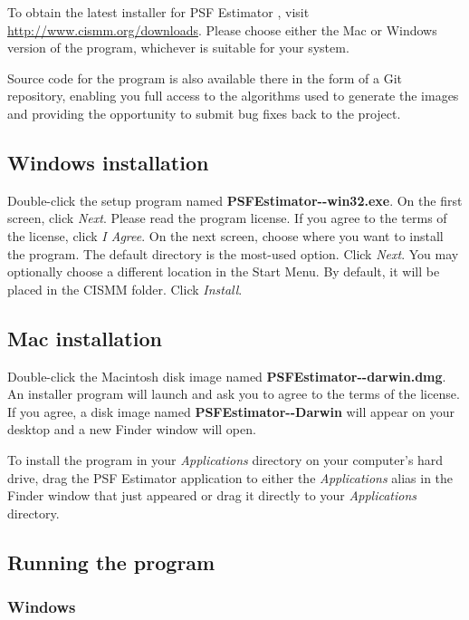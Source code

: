 \documentclass[11pt,titlepage,twoside]{article}
\begin{document}
To obtain the latest installer for PSF Estimator \ProgramVersionNoSpace, visit \url{http://www.cismm.org/downloads}. Please choose either the Mac or Windows version of the program, whichever is suitable for your system.

Source code for the program is also available there in the form of a Git repository, enabling you full access to the algorithms used to generate the images and providing the opportunity to submit bug fixes back to the project. 

\subsection{Windows installation}

Double-click the setup program named \textbf{PSFEstimator-\ProgramVersionNoSpace-win32.exe}. On the first screen, click \emph{Next}. Please read the program license. If you agree to the terms of the license, click \emph{I Agree}. On the next screen, choose where you want to install the program. The default directory is the most-used option. Click \emph{Next}. You may optionally choose a different location in the Start Menu. By default, it will be placed in the CISMM folder. Click \emph{Install}.

\subsection{Mac installation}

Double-click the Macintosh disk image named \textbf{PSFEstimator-\ProgramVersionNoSpace-darwin.dmg}. An installer program will launch and ask you to agree to the terms of the license. If you agree, a disk image named \textbf{PSFEstimator-\ProgramVersionNoSpace-Darwin} will appear on your desktop and a new Finder window will open.

To install the program in your \emph{Applications} directory on your computer's hard drive, drag the PSF Estimator \ProgramVersion application to either the \emph{Applications} alias in the Finder window that just appeared or drag it directly to your \emph{Applications} directory.

\subsection{Running the program}

\subsubsection{Windows}
\end{document}
